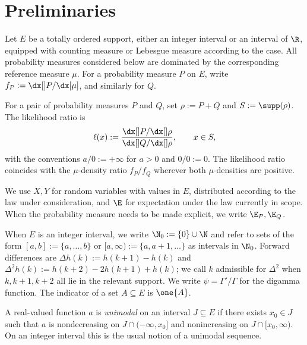 \documentclass[11pt]{article}
\begin{document}


\section{Preliminaries}
\label{sec:prelim}

Let \(E\) be a totally ordered support, either an integer interval or an interval of \(\R\), equipped with counting measure or Lebesgue measure according to the case. All probability measures considered below are dominated by the corresponding reference measure \(\mu\). For a probability measure  \(P\) on \(E\), write \(f_P:=\dx[]P/\dx[\mu]\), and similarly for \(Q\).

For a pair of probability measures \(P\) and \(Q\), set \(\rho:=P+Q\) and \(S:=\supp(\rho)\). The likelihood ratio is
\begin{equation}
    \label{def.ell}
    \ell(x):=\frac{\dx[]P/\dx[]\rho}{\dx[]Q/\dx[]\rho}, \qquad x\in S,
\end{equation}
with the conventions $a/0:=+\infty$ for $a>0$ and $0/0:=0$. The likelihood ratio coincides with the $\mu$-density ratio $f_P/f_Q$ wherever both $\mu$-densities are positive.

We use \(X,Y\) for random variables with values in \(E\), distributed according to the law under consideration, and \(\E\) for expectation under the law currently in scope. When the probability measure needs to be made explicit, we write \(\E_P,\E_Q\).

When \(E\) is an integer interval, we write \(\N_0:=\{0\}\cup\N\) and refer to sets of the form \([a,b]:=\{a,\dots,b\}\) or \([a,\infty):=\{a,a{+}1,\dots\}\) as intervals in \(\N_0\).  Forward differences are \(\Delta h(k):=h(k+1)-h(k)\) and \(\Delta^2 h(k):=h(k+2)-2h(k+1)+h(k)\); we call \(k\) admissible for \(\Delta^2\) when \(k,k+1,k+2\) all lie in the relevant support. We write \(\psi=\Gamma'/\Gamma\) for the digamma function.  The indicator of a set \(A\subseteq E\) is \(\one\{A\}\).

\begin{defn}[Unimodality] \label{def:unimodal}
A real-valued function \(a\) is \emph{unimodal} on an interval \(J\subseteq E\) if there exists \(x_0\in J\) such that \(a\) is nondecreasing on \(J\cap(-\infty,x_0]\) and nonincreasing on \(J\cap[x_0,\infty)\).  On an integer interval this is the usual notion of a unimodal sequence.
\end{defn}
\end{document}
